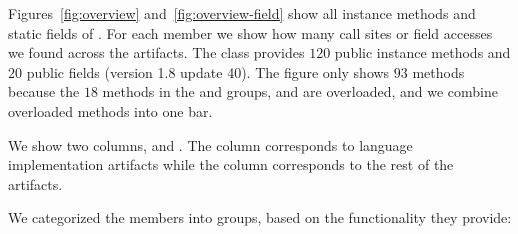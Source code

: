 Figures~\ref{fig:overview} and~\ref{fig:overview-field} show all instance methods and static fields of \smu{}. For each member we show how many call sites or field accesses we found across the artifacts. The class provides $120$ public instance methods and $20$ public fields (version 1.8 update 40). The figure only shows $93$ methods because the $18$ methods in the  and  groups, and  are overloaded, and we combine overloaded methods into one bar.

We show two columns,  and .
The  column corresponds to language implementation artifacts while the  column corresponds to the rest of the artifacts.

We categorized the members into groups, based on the functionality they provide:


